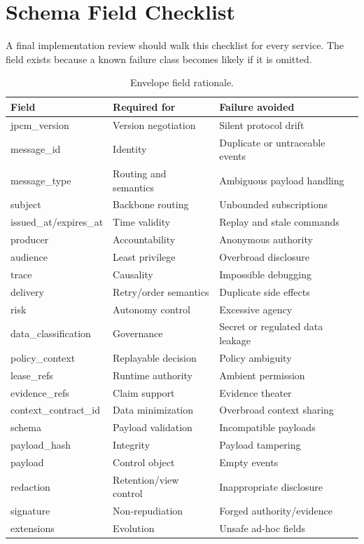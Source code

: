 \documentclass[journal,onecolumn]{IEEEtran}
\begin{document}
\section{Schema Field Checklist}
A final implementation review should walk this checklist for every service. The field exists because a known failure class becomes likely if it is omitted.

\begin{longtable}{p{}p{}p{}}
\caption{Envelope field rationale.}\\
\toprule
Field & Required for & Failure avoided\\
\midrule
jpcm\_version & Version negotiation & Silent protocol drift\\
message\_id & Identity & Duplicate or untraceable events\\
message\_type & Routing and semantics & Ambiguous payload handling\\
subject & Backbone routing & Unbounded subscriptions\\
issued\_at/expires\_at & Time validity & Replay and stale commands\\
producer & Accountability & Anonymous authority\\
audience & Least privilege & Overbroad disclosure\\
trace & Causality & Impossible debugging\\
delivery & Retry/order semantics & Duplicate side effects\\
risk & Autonomy control & Excessive agency\\
data\_classification & Governance & Secret or regulated data leakage\\
policy\_context & Replayable decision & Policy ambiguity\\
lease\_refs & Runtime authority & Ambient permission\\
evidence\_refs & Claim support & Evidence theater\\
context\_contract\_id & Data minimization & Overbroad context sharing\\
schema & Payload validation & Incompatible payloads\\
payload\_hash & Integrity & Payload tampering\\
payload & Control object & Empty events\\
redaction & Retention/view control & Inappropriate disclosure\\
signature & Non-repudiation & Forged authority/evidence\\
extensions & Evolution & Unsafe ad-hoc fields\\
\bottomrule
\end{longtable}
\end{document}
